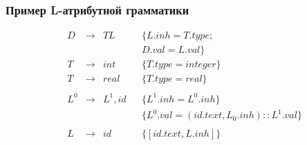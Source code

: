 \documentclass{beamer}
\begin{document}
\begin{frame}[fragile]
  \transwipe[direction=90]
  \frametitle{Пример L-атрибутной грамматики}
$$
\begin{array}{ccclll}
&D  & \rightarrow & TL      &                                &\{L.inh = T.type;\\
&   &             &         &                                &  D.val = L.val\} \\
&T  & \rightarrow & int     &                                &\{T.type = integer\}\\
&T  & \rightarrow & real    &                                &\{T.type = real\}\\~\\

&L^0& \rightarrow & L^1, id &                                &\{L^1.inh = L^0.inh\}\\
&   &             &         &                                &\{L^0.val = (id.text, L_0.inh) :: L^1.val\}\\~\\ 

& L & \rightarrow &  id     &                                &\{[id.text, L.inh]\}\\
\end{array}
$$  
\end{frame}
\end{document}
